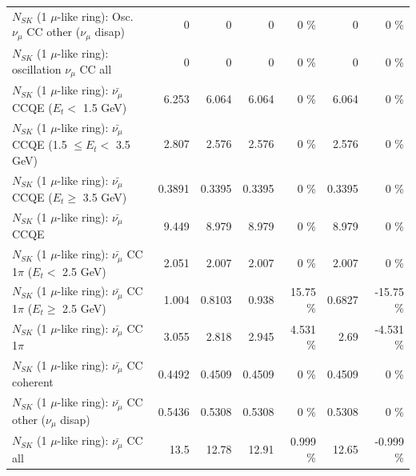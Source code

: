 \begin{table}
\begin{tabular}{| l | r | r | r  r | r  r |}
         $N_{SK}$ (1 $\mu$-like ring): Osc. $\nu_\mu$ CC other ($\nu_\mu$ disap) &               0 &               0 &               0 &        0 \%  &               0 &        0 \%  \\ 
                      $N_{SK}$ (1 $\mu$-like ring): oscillation $\nu_\mu$ CC all &               0 &               0 &               0 &        0 \%  &               0 &        0 \%  \\ 
\hline
\hline
          $N_{SK}$ (1 $\mu$-like ring): $\bar{\nu_\mu}$ CCQE ($E_{t} <$ 1.5 GeV) &           6.253 &           6.064 &           6.064 &        0 \%  &           6.064 &        0 \%  \\ 
 $N_{SK}$ (1 $\mu$-like ring): $\bar{\nu_\mu}$ CCQE (1.5 $\leq E_{t} <$ 3.5 GeV) &           2.807 &           2.576 &           2.576 &        0 \%  &           2.576 &        0 \%  \\ 
       $N_{SK}$ (1 $\mu$-like ring): $\bar{\nu_\mu}$ CCQE ($E_{t} \geq$ 3.5 GeV) &          0.3891 &          0.3395 &          0.3395 &        0 \%  &          0.3395 &        0 \%  \\ 
\hline
                              $N_{SK}$ (1 $\mu$-like ring): $\bar{\nu_\mu}$ CCQE &           9.449 &           8.979 &           8.979 &        0 \%  &           8.979 &        0 \%  \\ 
\hline
     $N_{SK}$ (1 $\mu$-like ring): $\bar{\nu_\mu}$ CC 1$\pi$ ($E_{t} <$ 2.5 GeV) &           2.051 &           2.007 &           2.007 &        0 \%  &           2.007 &        0 \%  \\ 
  $N_{SK}$ (1 $\mu$-like ring): $\bar{\nu_\mu}$ CC 1$\pi$ ($E_{t} \geq$ 2.5 GeV) &           1.004 &          0.8103 &           0.938 &    15.75 \%  &          0.6827 &   -15.75 \%  \\ 
\hline
                         $N_{SK}$ (1 $\mu$-like ring): $\bar{\nu_\mu}$ CC 1$\pi$ &           3.055 &           2.818 &           2.945 &    4.531 \%  &            2.69 &   -4.531 \%  \\ 
                       $N_{SK}$ (1 $\mu$-like ring): $\bar{\nu_\mu}$ CC coherent &          0.4492 &          0.4509 &          0.4509 &        0 \%  &          0.4509 &        0 \%  \\ 
        $N_{SK}$ (1 $\mu$-like ring): $\bar{\nu_\mu}$ CC other ($\nu_\mu$ disap) &          0.5436 &          0.5308 &          0.5308 &        0 \%  &          0.5308 &        0 \%  \\ 
                          $N_{SK}$ (1 $\mu$-like ring): $\bar{\nu_{\mu}}$ CC all &            13.5 &           12.78 &           12.91 &    0.999 \%  &           12.65 &   -0.999 \%  \\ 

\end{tabular}
\end{table}
